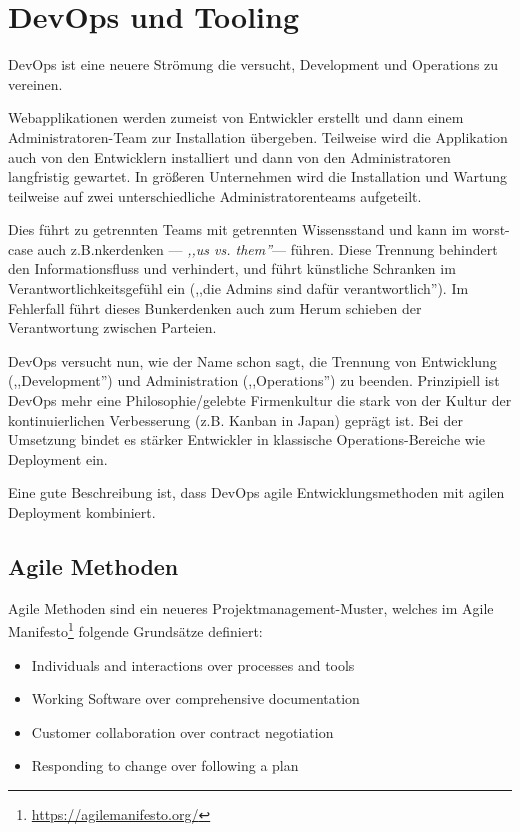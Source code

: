 \section{DevOps und Tooling}

DevOps ist eine neuere Strömung die versucht, Development und Operations zu vereinen.

Webapplikationen werden zumeist von Entwickler erstellt und dann einem Administratoren-Team zur Installation übergeben. Teilweise wird die Applikation auch von den Entwicklern installiert und dann von den Administratoren langfristig gewartet. In größeren Unternehmen wird die Installation und Wartung teilweise auf zwei unterschiedliche Administratorenteams aufgeteilt.

Dies führt zu getrennten Teams mit getrennten Wissensstand und kann im worst-case auch z.B.nkerdenken --- \textit{,,us vs. them''}--- führen. Diese Trennung behindert den Informationsfluss und verhindert, und führt künstliche Schranken im Verantwortlichkeitsgefühl ein (,,die Admins sind dafür verantwortlich''). Im Fehlerfall führt dieses Bunkerdenken auch zum Herum schieben der Verantwortung zwischen Parteien.

DevOps versucht nun, wie der Name schon sagt, die Trennung von Entwicklung (,,Development'') und Administration (,,Operations'') zu beenden. Prinzipiell ist DevOps mehr eine Philosophie/gelebte Firmenkultur die stark von der Kultur der kontinuierlichen Verbesserung (z.B. Kanban in Japan) geprägt ist. Bei der Umsetzung bindet es stärker Entwickler in klassische Operations-Bereiche wie Deployment ein.

Eine gute Beschreibung ist, dass DevOps agile Entwicklungsmethoden mit agilen Deployment kombiniert.

\subsection{Agile Methoden}

Agile Methoden sind ein neueres Projektmanagement-Muster, welches im Agile Manifesto\footnote{\url{https://agilemanifesto.org/}} folgende Grundsätze definiert:

\begin{itemize}
	\item Individuals and interactions over processes and tools
	\item Working Software over comprehensive documentation
	\item Customer collaboration over contract negotiation
	\item Responding to change over following a plan
\end{itemize}

